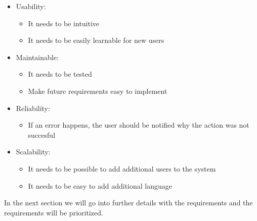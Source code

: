 \begin{itemize}
    \item Usability:
    \begin{itemize}
        \item It needs to be intuitive
        \item It needs to be easily learnable for new users
    \end{itemize}
    \item Maintainable:
    \begin{itemize}
        \item It needs to be tested
        \item Make future requirements easy to implement
    \end{itemize}
    \item Reliability:
    \begin{itemize}
        \item If an error happens, the user should be notified why the action was not succesful
    \end{itemize}
    \item Scalability:
    \begin{itemize}
        \item It needs to be possible to add additional users to the system
        \item It needs to be easy to add additional language
    \end{itemize}
\end{itemize}
\noindent
In the next section we will go into further details with the requirements and the requirements will be prioritized.
